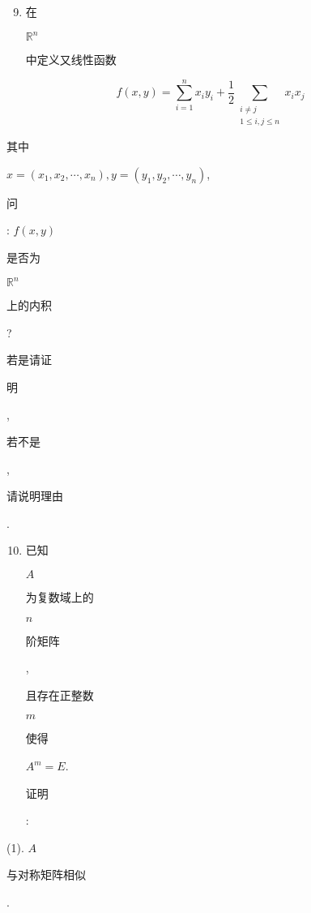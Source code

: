 \documentclass[10pt]{article}
\begin{document}
\begin{enumerate}
  \setcounter{enumi}{8}
  \item \begin{CJK}{UTF8}{mj}在\end{CJK} $\mathbb{R}^{n}$ \begin{CJK}{UTF8}{mj}中定义又线性函数\end{CJK}
\end{enumerate}
$$
f(x, y)=\sum_{i=1}^{n} x_{i} y_{i}+\frac{1}{2} \sum_{\substack{i \neq j \\ 1 \leq i, j \leq n}} x_{i} x_{j}
$$
\begin{CJK}{UTF8}{mj}其中\end{CJK} $x=\left(x_{1}, x_{2}, \cdots, x_{n}\right), y=\left(y_{1}, y_{2}, \cdots, y_{n}\right)$, \begin{CJK}{UTF8}{mj}问\end{CJK}: $f(x, y)$ \begin{CJK}{UTF8}{mj}是否为\end{CJK} $\mathbb{R}^{n}$ \begin{CJK}{UTF8}{mj}上的内积\end{CJK}? \begin{CJK}{UTF8}{mj}若是请证\end{CJK} \begin{CJK}{UTF8}{mj}明\end{CJK}, \begin{CJK}{UTF8}{mj}若不是\end{CJK}, \begin{CJK}{UTF8}{mj}请说明理由\end{CJK}.

\begin{enumerate}
  \setcounter{enumi}{9}
  \item \begin{CJK}{UTF8}{mj}已知\end{CJK} $A$ \begin{CJK}{UTF8}{mj}为复数域上的\end{CJK} $n$ \begin{CJK}{UTF8}{mj}阶矩阵\end{CJK}, \begin{CJK}{UTF8}{mj}且存在正整数\end{CJK} $m$ \begin{CJK}{UTF8}{mj}使得\end{CJK} $A^{m}=E$. \begin{CJK}{UTF8}{mj}证明\end{CJK}:
\end{enumerate}
(1). $A$ \begin{CJK}{UTF8}{mj}与对称矩阵相似\end{CJK}.
\end{document}
